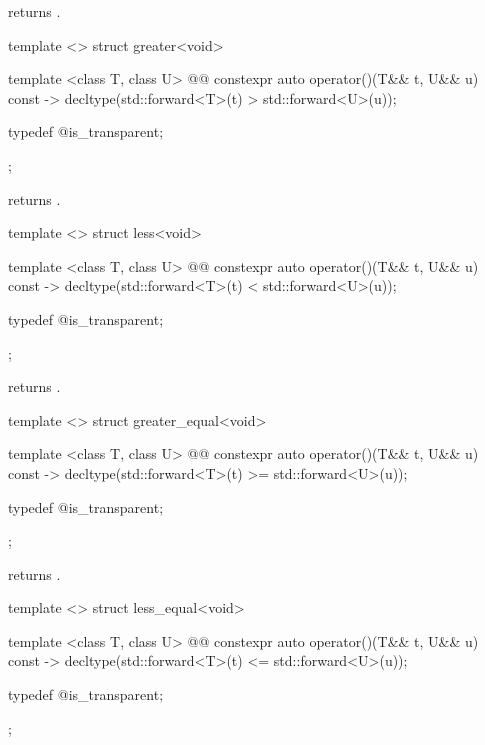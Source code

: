 \begin{itemdescr}
\pnum
{} returns .
\end{itemdescr}

%
\begin{itemdecl}
template <> struct greater<void> {
  template <class T, class U>
    @@
  constexpr auto operator()(T&& t, U&& u) const
    -> decltype(std::forward<T>(t) > std::forward<U>(u));

  typedef @\unspec@ is_transparent;
};
\end{itemdecl}

\begin{itemdescr}
\pnum
{} returns .
\end{itemdescr}

%
\begin{itemdecl}
template <> struct less<void> {
  template <class T, class U>
    @@
  constexpr auto operator()(T&& t, U&& u) const
    -> decltype(std::forward<T>(t) < std::forward<U>(u));

  typedef @\unspec@ is_transparent;
};
\end{itemdecl}

\begin{itemdescr}
\pnum
{} returns .
\end{itemdescr}

%
\begin{itemdecl}
template <> struct greater_equal<void> {
  template <class T, class U>
    @@
  constexpr auto operator()(T&& t, U&& u) const
    -> decltype(std::forward<T>(t) >= std::forward<U>(u));

  typedef @\unspec@ is_transparent;
};
\end{itemdecl}

\begin{itemdescr}
\pnum
{} returns .
\end{itemdescr}

%
\begin{itemdecl}
template <> struct less_equal<void> {
  template <class T, class U>
    @@
  constexpr auto operator()(T&& t, U&& u) const
    -> decltype(std::forward<T>(t) <= std::forward<U>(u));

  typedef @\unspec@ is_transparent;
};
\end{itemdecl}


